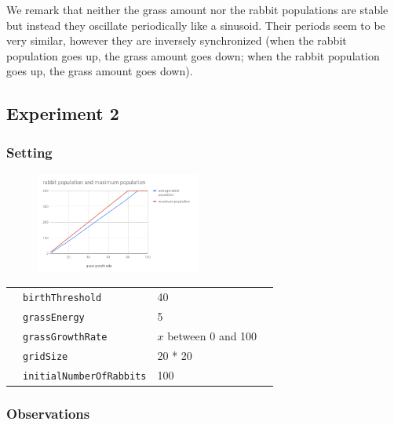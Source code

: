 \documentclass[11pt]{article}
\begin{document}
 We remark that neither the grass amount nor the rabbit populations 
 are stable but instead they oscillate periodically like a sinusoid. 
 Their periods seem to be very similar, however they are inversely 
 synchronized (when the rabbit population goes up, the grass amount goes down; 
 when the rabbit population goes up, the grass amount goes down).


 \subsection{Experiment 2}
 \subsubsection{Setting}

   \begin{figure}
  \vspace{-20pt}
  \begin{center}
    \includegraphics[width=0.48\textwidth]{grassgrowth.png}
  \end{center}
  \vspace{-20pt}
\end{figure}

 \begin{table}[H]
  \begin{tabular}{llll}
   &\texttt{birthThreshold }  &40\\
   &\texttt{\texttt{grassEnergy}}  &5 \\
   &\texttt{grassGrowthRate}  &$x$ between 0 and 100\\
   &\texttt{gridSize}  &20 * 20\\
   &\texttt{initialNumberOfRabbits}  &100
  \end{tabular}
 \end{table}
 


 \subsubsection{Observations}
  
\end{document}
